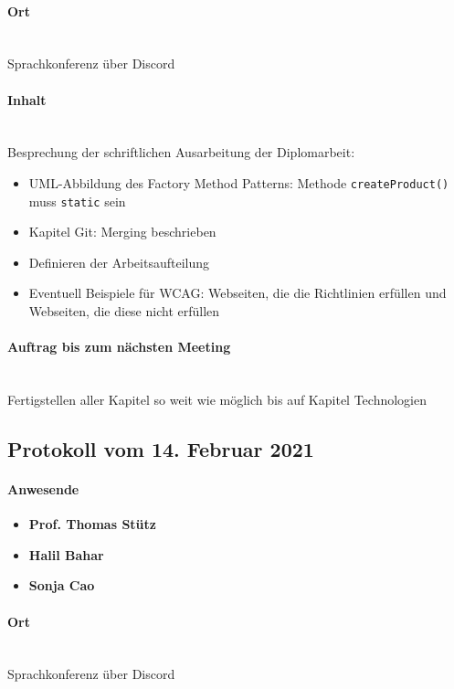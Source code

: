 \paragraph{Ort}\mbox{}\\
Sprachkonferenz über Discord

\paragraph{Inhalt}\mbox{}\\
Besprechung der schriftlichen Ausarbeitung der Diplomarbeit:
\begin{itemize}
	\item UML-Abbildung des Factory Method Patterns: Methode \texttt{createProduct()} muss \texttt{static} sein
	\item Kapitel Git: Merging beschrieben
	\item Definieren der Arbeitsaufteilung
	\item Eventuell Beispiele für WCAG: Webseiten, die die Richtlinien erfüllen und Webseiten, die diese nicht 
		erfüllen	
\end{itemize}

\paragraph{Auftrag bis zum nächsten Meeting}\mbox{}\\
Fertigstellen aller Kapitel so weit wie möglich bis auf Kapitel Technologien

\subsection{Protokoll vom 14. Februar 2021}

\paragraph{Anwesende}
\begin{itemize}
	\item{\textbf{Prof. Thomas Stütz}}
	\item{\textbf{Halil Bahar}}
	\item{\textbf{Sonja Cao}}
\end{itemize}

\paragraph{Ort}\mbox{}\\
Sprachkonferenz über Discord

